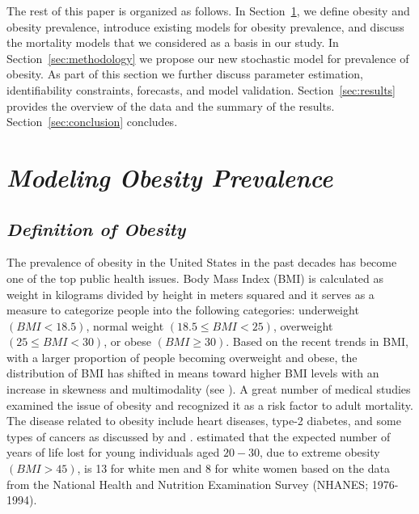 \documentclass[11pt,letterpaper]{article}
\numberwithin{equation}{section}
\begin{document}
The rest of this paper is organized as follows. In Section~\ref{sec:modeling}, we define obesity and obesity prevalence, introduce existing models for obesity prevalence, and discuss the mortality models that we considered as a basis in our study.  In Section~\ref{sec:methodology} we propose our new stochastic model for  prevalence of obesity. As part of this section we further discuss parameter estimation, identifiability constraints, forecasts, and model validation. Section~\ref{sec:results} provides the overview of the data and the summary of the results. Section~\ref{sec:conclusion} concludes.


\section{\textit{Modeling Obesity Prevalence}}\label{sec:modeling}

\subsection{\textit{Definition of Obesity}}
The prevalence of obesity in the United States in the past decades has become one of the top public health issues. Body Mass Index (BMI) is calculated as weight in kilograms divided by height in meters squared and it serves as a measure to categorize people into  the following categories: underweight $(BMI < 18.5)$, normal weight $(18.5 \leq BMI < 25)$, overweight $(25 \leq BMI< 30)$, or obese $(BMI \geq 30)$. Based on the recent trends in BMI, with a larger proportion of people becoming overweight and obese, the distribution of BMI has shifted in means toward higher BMI levels with an increase in skewness and multimodality (see \cite{Miljkovic+Shaik+Miljkovic:2005}). A great number of medical studies examined the issue of obesity and recognized it as a risk factor to adult mortality.  The disease related to obesity include heart diseases, type-2 diabetes, and some types of cancers as discussed by \cite{Must+Spadano+Coakley+Field+Colditz+Dietz:1999} and \cite{Ebbeling+Pawlak+Ludwig:2002}. \cite{Fontaine+Redden+Wang+Westfall+Allison:2003} estimated that the expected number of years of life lost for young individuals aged $20-30$, due to extreme obesity $(BMI>45)$, is 13 for white men and 8 for white women based on the data from the National Health and Nutrition Examination Survey (NHANES; 1976-1994).
\end{document}

